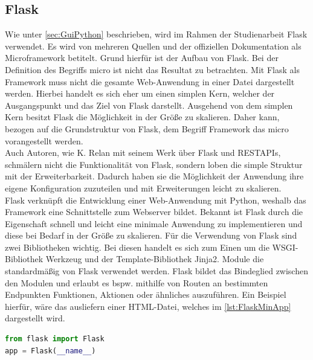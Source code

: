 \documentclass[a4paper,titlepage,halfparskip,12pt]{scrreprt}
\begin{document}
\begin{onehalfspacing}
\section{Flask}
\label{sec:Flask}
Wie unter \autoref{sec:GuiPython} beschrieben, wird im Rahmen der Studienarbeit Flask verwendet. Es wird von mehreren Quellen und der offiziellen Dokumentation als Microframework betitelt. Grund hierfür ist der Aufbau von Flask. Bei der Definition des Begriffs \glqq micro\grqq{} ist nicht das Resultat zu betrachten. Mit Flask als Framework muss nicht die gesamte Web-Anwendung in einer Datei dargestellt werden. Hierbei handelt es sich eher um einen simplen Kern, welcher der Ausgangspunkt und das Ziel von Flask darstellt. Ausgehend von dem simplen Kern besitzt Flask die Möglichkeit in der Größe zu skalieren. Daher kann, bezogen auf die Grundstruktur von Flask, dem Begriff Framework das \glqq micro\grqq{} vorangestellt werden.\cite{FlaskDoc}\\
Auch Autoren, wie K. Relan mit seinem Werk über Flask und RESTAPIs, schmälern nicht die Funktionalität von Flask, sondern loben die simple Struktur mit der Erweiterbarkeit. Dadurch haben sie die Möglichkeit der Anwendung ihre eigene Konfiguration zuzuteilen und mit Erweiterungen leicht zu skalieren. \cite{FlaskRESTAPIsRelan}\\
Flask verknüpft die Entwicklung einer Web-Anwendung mit Python, weshalb das Framework eine Schnittstelle zum Webserver bildet. Bekannt ist Flask durch die Eigenschaft schnell und leicht eine minimale Anwendung zu implementieren und diese bei Bedarf in der Größe zu skalieren. Für die Verwendung von Flask sind zwei Bibliotheken wichtig. Bei diesen handelt es sich zum Einen um die \ac{WSGI}-Bibliothek Werkzeug und der Template-Bibliothek Jinja2. Module die standardmäßig von Flask verwendet werden. Flask bildet das Bindeglied zwischen den Modulen und erlaubt es bspw. mithilfe von Routen an bestimmten Endpunkten Funktionen, Aktionen oder ähnliches auszuführen. Ein Beispiel hierfür, wäre das ausliefern einer \ac{HTML}-Datei, welches im \autoref{lst:FlaskMinApp} dargestellt wird.
\begin{lstlisting}[language=Python,caption=Example Listing of Flask Python,label={lst:FlaskMinApp}]
from flask import Flask
app = Flask(__name__)


\end{lstlisting}
\end{onehalfspacing}
\end{document}
